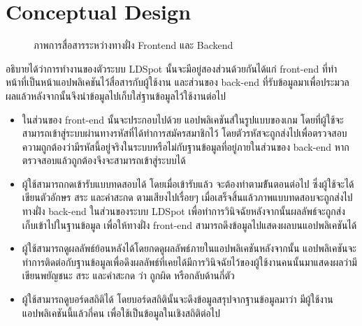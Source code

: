 \documentclass[12pt,oneside,openright,a4paper]{cpe-thai-project}
\begin{document}
\section{Conceptual  Design}
\begin{figure}[!ht]\centering
  \setlength{\fboxrule}{0.2mm} %
  \setlength{\fboxsep}{1cm}
  \caption{ภาพการสื่อสารระหว่างทางฝั่ง Frontend และ Backend}\label{fig:conceptual}
 \end{figure}
 อธิบายได้ว่าการทำงานของตัวระบบ LDSpot นั้นจะมีอยู่สองส่วนด้วยกันได้แก่ front-end ที่ทำหน้าที่เป็นหน้าแอปพลิเคชันไว้สื่อสารกับผู้ใช้งาน
  และส่วนของ back-end ที่รับข้อมูลมาเพื่อประมวลผลแล้วหลังจากนั้นจึงนำข้อมูลไปเก็บใส่ฐานข้อมูลไว้ใช้งานต่อไป 
 \begin{itemize}
   \item ในส่วนของ front-end นั้นจะประกอบไปด้วย แอปพลิเคชันส์ในรูปแบบของเกม โดยที่ผู้ใช้จะสามารถเข้าสู่ระบบผ่านทางรหัสที่ได้ทำการสมัครสมาชิกไว้
    โดยตัวรหัสจะถูกส่งไปเพื่อตรวจสอบความถูกต้องว่ามีรหัสนี้อยู่จริงในระบบหรือไม่กับฐานข้อมูลที่อยู่ภายในส่วนของ back-end หากตรวจสอบแล้วถูกต้องจึงจะสามารถเข้าสู่ระบบได้ 
   \item ผู้ใช้สามารถกดเข้ารับแบบทดสอบได้ โดยเมื่อเข้ารับแล้ว จะต้องทำตามข้ันตอนต่อไป ซึ่งผู้ใช้จะได้เขียนตัวอักษร สระ และคำสะกด ตามเสียงไปเรื่อยๆ เมื่อเสร็จสิ้นแล้วภาพแบบทดสอบจะถูกส่งไปทางฝั่ง back-end 
   ในส่วนของระบบ LDSpot เพื่อทำการวินิจฉัยหลังจากนั้นผลลัพธ์จะถูกส่งเก็บเข้าไปในฐานข้อมูล เพื่อให้ทางฝั่ง front-end สามารถดึงข้อมูลไปแสดงผลบนแอปพลิเคชันได้
   \item ผู้ใช้สามารถดูผลลัพธ์ย้อนหลังได้โดยกดดูผลลัพธ์ภายในแอปพลิเคชันหลังจากนั้น แอปพลิเคชันจะทำการติดต่อกับฐานข้อมูลเพื่อดึงผลลัพธ์ที่เคยได้มีการวินิจฉัยไว้ของผู้ใช้งานคนนั้นมาแสดงผลว่ามีเขียนพยัญชนะ สระ และคำสะกด ว่า ถูกผิด หรือกลับด้านกี่ตัว
   \item ผู้ใช้สามารถดูบอร์ดสถิติได้ โดยบอร์ดสถิตินั้นจะดึงข้อมูลสรุปจากฐานข้อมูลมาว่า มีผู้ใช้งานแอปพลิเคชันนี้แล้วกี่คน  เพื่อใช้เป็นข้อมูลในเชิงสถิติต่อไป
 \end{itemize}
\end{document}
